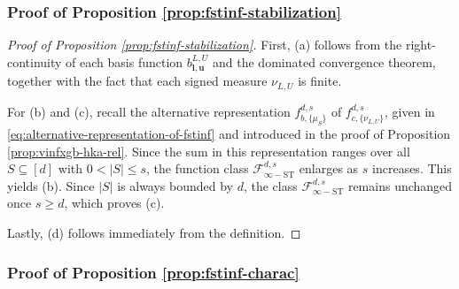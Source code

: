 \documentclass[10pt]{article}
\newcommand{\fstinf}{{\mathcal{F}^{d, s}_{\infty-\text{ST}}}}
\newcommand{\fcnu}{{f^{d, s}_{c, \{\nu_{L, U}\}}}}
\newcommand{\lbf}{{\mathbf{l}}}
\newcommand{\ubf}{{\mathbf{u}}}
\begin{document}
\subsubsection{Proof of Proposition \ref{prop:fstinf-stabilization}}
\label{pf:fstinf-stabilization}
\begin{proof}[Proof of Proposition \ref{prop:fstinf-stabilization}]
First, (a) follows from the right-continuity of each basis function 
$b^{L, U}_{\lbf, \ubf}$ and the dominated 
convergence theorem, together with the fact that each signed measure 
$\nu_{L, U}$ is finite.

For (b) and (c), recall the alternative representation 
$f^{d, s}_{b, \{\mu_S\}}$ of $\fcnu$, given in 
\eqref{eq:alternative-representation-of-fstinf} and 
introduced in the proof of Proposition \ref{prop:vinfxgb-hka-rel}. 
Since the sum in this representation ranges over all 
$S \subseteq [d]$ with $0 < |S| \le s$, the function 
class $\fstinf$ enlarges as $s$ increases. This yields (b). Since 
$|S|$ is always bounded by $d$, the class $\fstinf$ remains unchanged 
once $s \ge d$, which proves (c).

Lastly, (d) follows immediately from the definition.
\end{proof}



\subsubsection{Proof of Proposition \ref{prop:fstinf-charac}}
\label{pf:fstinf-charac}
\end{document}
